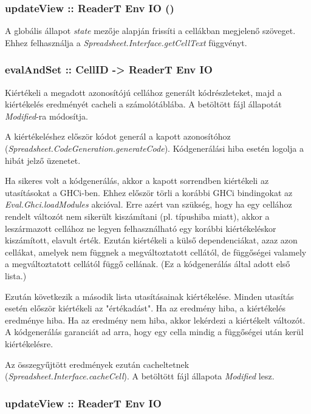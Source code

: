 \subsubsection{updateView :: ReaderT Env IO ()}

A globális állapot \textit{state} mezője alapján frissíti a cellákban megjelenő szöveget. Ehhez felhasználja a \textit{Spreadsheet.Interface.getCellText} függvényt.

\subsubsection{evalAndSet :: CellID -> ReaderT Env IO}

Kiértékeli a megadott azonosítójú cellához generált kódrészleteket, majd a kiértékelés eredményét cacheli a számolótáblába. A betöltött fájl állapotát \textit{Modified}-ra módosítja.

A kiértékeléshez először kódot generál a kapott azonosítóhoz \mbox{(\textit{Spreadsheet.CodeGeneration.generateCode})}. Kódgenerálási hiba esetén logolja a hibát jelző üzenetet. 

Ha sikeres volt a kódgenerálás, akkor a kapott sorrendben kiértékeli az utasításokat a GHCi-ben. Ehhez először törli a korábbi GHCi bindingokat az \textit{Eval.Ghci.loadModules} akcióval. Erre azért van szükség, hogy ha egy cellához rendelt változót nem sikerült kiszámítani (pl. típushiba miatt), akkor a leszármazott cellához ne legyen felhasználható egy korábbi kiértékeléskor kiszámított, elavult érték. Ezután kiértékeli a külső dependenciákat, azaz azon cellákat, amelyek nem függnek a megváltoztatott cellától, de függőségei valamely  a megváltoztatott cellától függő cellának. (Ez a kódgenerálás által adott első lista.)

Ezután következik a második lista utasításainak kiértékelése. Minden utasítás esetén először kiértékeli az "értékadást". Ha az eredmény hiba, a kiértékelés eredménye hiba. Ha az eredmény nem hiba, akkor lekérdezi a kiértékelt változót. A kódgenerálás garanciát ad arra, hogy egy cella mindig a függőségei után kerül kiértékelésre.

Az összegyűjtött eredmények ezután cacheltetnek \mbox{(\textit{Spreadsheet.Interface.cacheCell})}. A betöltött fájl állapota \textit{Modified} lesz.

\subsubsection{updateView :: ReaderT Env IO}

